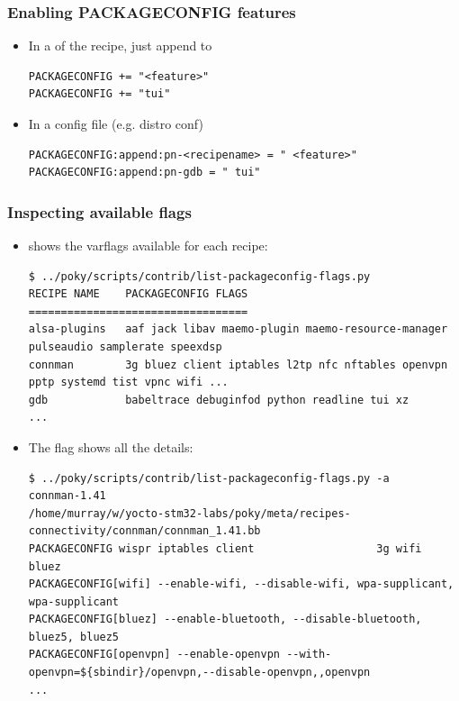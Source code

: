 \begin{frame}[fragile]
  \frametitle{Enabling PACKAGECONFIG features}
  \begin{itemize}
    \item In a  of the recipe, just append to 
      \begin{block}{}
        \begin{verbatim}
PACKAGECONFIG += "<feature>"
PACKAGECONFIG += "tui"
        \end{verbatim}
      \end{block}

    \item In a config file (e.g. distro conf)
      \begin{block}{}
        \begin{verbatim}
PACKAGECONFIG:append:pn-<recipename> = " <feature>"
PACKAGECONFIG:append:pn-gdb = " tui"
        \end{verbatim}
      \end{block}
  \end{itemize}
\end{frame}

\begin{frame}[fragile]
  \frametitle{Inspecting available  flags}
  \begin{itemize}
  \item {}
    shows the  varflags available for each recipe:

      \begin{block}{}
        \begin{verbatim}
$ ../poky/scripts/contrib/list-packageconfig-flags.py
RECIPE NAME    PACKAGECONFIG FLAGS
==================================
alsa-plugins   aaf jack libav maemo-plugin maemo-resource-manager pulseaudio samplerate speexdsp
connman        3g bluez client iptables l2tp nfc nftables openvpn pptp systemd tist vpnc wifi ...
gdb            babeltrace debuginfod python readline tui xz
...
        \end{verbatim}
      \end{block}

    \item The  flag shows all the details:
      \begin{block}{}
        \begin{verbatim}
$ ../poky/scripts/contrib/list-packageconfig-flags.py -a
connman-1.41
/home/murray/w/yocto-stm32-labs/poky/meta/recipes-connectivity/connman/connman_1.41.bb
PACKAGECONFIG wispr iptables client                   3g wifi                    bluez
PACKAGECONFIG[wifi] --enable-wifi, --disable-wifi, wpa-supplicant, wpa-supplicant
PACKAGECONFIG[bluez] --enable-bluetooth, --disable-bluetooth, bluez5, bluez5
PACKAGECONFIG[openvpn] --enable-openvpn --with-openvpn=${sbindir}/openvpn,--disable-openvpn,,openvpn
...
        \end{verbatim}
      \end{block}
  \end{itemize}
\end{frame}

